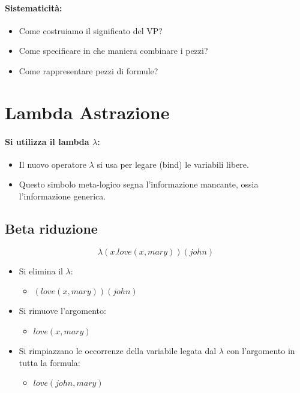 \paragraph{Sistematicità:}

\begin{itemize}
  \item Come costruiamo il significato del VP? 
  \item Come specificare in che maniera combinare i pezzi? 
  \item Come rappresentare pezzi di formule?
\end{itemize}

\section{Lambda Astrazione}

\paragraph{Si utilizza il lambda $\lambda$:}

\begin{itemize}
  \item Il nuovo operatore $\lambda$ si usa per legare (bind) le variabili libere. 
  \item Questo simbolo meta-logico segna l'informazione mancante, ossia l'informazione generica.
\end{itemize}

\subsection{Beta riduzione}

$$\lambda (x.love(x, mary)) (john)$$

\begin{itemize}
  \item Si elimina il $\lambda$:
    \begin{itemize}
      \item $(love(x, mary)) (john)$ 
    \end{itemize}
  \item Si rimuove l'argomento:
    \begin{itemize}
      \item $love(x, mary)$
    \end{itemize}
  \item Si rimpiazzano le occorrenze della variabile legata dal $\lambda$ con l'argomento in tutta la formula: 
    \begin{itemize}
      \item $love(john, mary)$
    \end{itemize}
\end{itemize}

